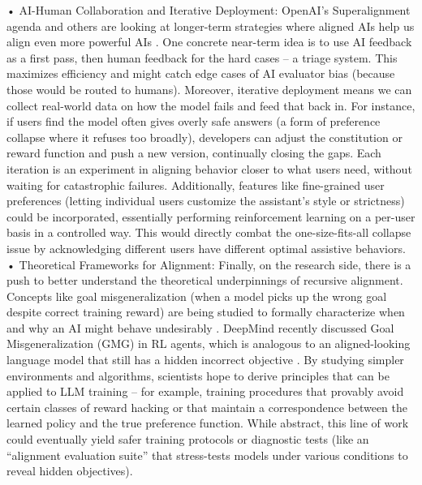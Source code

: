 \documentclass{article}
\begin{document}
	•	AI-Human Collaboration and Iterative Deployment: OpenAI’s Superalignment agenda and others are looking at longer-term strategies where aligned AIs help us align even more powerful AIs  . One concrete near-term idea is to use AI feedback as a first pass, then human feedback for the hard cases – a triage system. This maximizes efficiency and might catch edge cases of AI evaluator bias (because those would be routed to humans). Moreover, iterative deployment means we can collect real-world data on how the model fails and feed that back in. For instance, if users find the model often gives overly safe answers (a form of preference collapse where it refuses too broadly), developers can adjust the constitution or reward function and push a new version, continually closing the gaps. Each iteration is an experiment in aligning behavior closer to what users need, without waiting for catastrophic failures. Additionally, features like fine-grained user preferences (letting individual users customize the assistant’s style or strictness) could be incorporated, essentially performing reinforcement learning on a per-user basis in a controlled way. This would directly combat the one-size-fits-all collapse issue by acknowledging different users have different optimal assistive behaviors.
	•	Theoretical Frameworks for Alignment: Finally, on the research side, there is a push to better understand the theoretical underpinnings of recursive alignment. Concepts like goal misgeneralization (when a model picks up the wrong goal despite correct training reward) are being studied to formally characterize when and why an AI might behave undesirably . DeepMind recently discussed Goal Misgeneralization (GMG) in RL agents, which is analogous to an aligned-looking language model that still has a hidden incorrect objective . By studying simpler environments and algorithms, scientists hope to derive principles that can be applied to LLM training – for example, training procedures that provably avoid certain classes of reward hacking or that maintain a correspondence between the learned policy and the true preference function. While abstract, this line of work could eventually yield safer training protocols or diagnostic tests (like an “alignment evaluation suite” that stress-tests models under various conditions to reveal hidden objectives).
\end{document}
